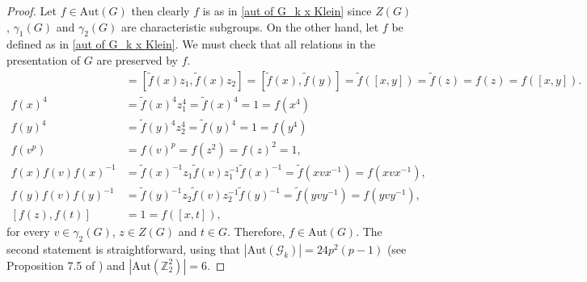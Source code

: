 \documentclass[a4paper, english, 9pt]{amsart}
\theoremstyle{plain}
\theoremstyle{definition}
\def\aut#1{\mathrm{Aut}(#1)}
\def\Z{\mathbb Z}
\begin{document}
\begin{proof}
  Let $f\in \aut{G}$ then clearly $f$ is as in \eqref{aut of G_k x Klein} since $Z(G)$, $\gamma_1(G)$ and $\gamma_2(G)$ are characteristic subgroups. On the other hand, let $f$ be defined as in \eqref{aut of G_k x Klein}. We must check that all relations in the presentation of $G$ are preserved by $f$. 
  \begin{align*}
      [f(x),f(y)]&=[\widetilde{f}(x)z_1,\widetilde{f}(x)z_2]=[\widetilde{f}(x),\widetilde{f}(y)]=\widetilde{f}([x,y])=\widetilde{f}(z)=f(z)=f([x,y]).\\
      f(x)^4&=\widetilde{f}(x)^4 z_1^4=\widetilde{f}(x)^4=1=f(x^4)\\
      f(y)^4&=\widetilde{f}(y)^4 z_2^4=\widetilde{f}(y)^4=1=f(y^4)\\
      f(v^p)&=f(v)^p=f(z^2)=f(z)^2=1, \\
      f(x) f(v) f(x)^{-1}&=\widetilde{f}(x)^{-1}z_1\widetilde{f}(v)z_1^{-1}\widetilde{f}(x)^{-1}=\widetilde{f}(xvx^{-1})=f(xvx^{-1}),\\
      f(y) f(v) f(y)^{-1}&=\widetilde{f}(y)^{-1}z_2\widetilde{f}(v)z_2^{-1}\widetilde{f}(y)^{-1}=\widetilde{f}(yvy^{-1})=f(yvy^{-1}),\\
    [f(z),f(t)]&=1=f([x,t]),
  \end{align*}
for every $v\in \gamma_2(G)$, $z\in Z(G)$ and $t\in G$. Therefore, $f\in \aut{G}$. The second statement is straightforward, using that $|\aut{\mathcal{G}_k}|=24p^2(p-1)$ (see Proposition 7.5 of \cite{LSS}) and $|\aut{\Z_2^2}|=6$.
\end{proof}
\end{document}
